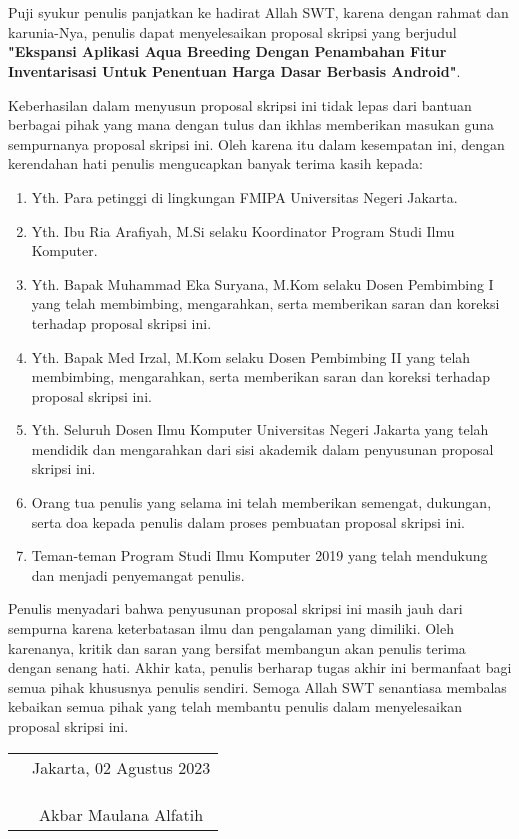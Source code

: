 \chapter*{}
 
\begin{spacing}{1.5}
	
Puji syukur penulis panjatkan ke hadirat Allah SWT, karena dengan rahmat dan karunia-Nya, penulis dapat menyelesaikan proposal skripsi yang berjudul \textbf{"Ekspansi Aplikasi Aqua Breeding Dengan Penambahan Fitur Inventarisasi Untuk Penentuan Harga Dasar Berbasis Android"}.

Keberhasilan dalam menyusun proposal skripsi ini tidak lepas dari bantuan berbagai pihak yang mana dengan tulus dan ikhlas memberikan masukan guna sempurnanya proposal skripsi ini. Oleh karena itu dalam kesempatan ini, dengan kerendahan hati penulis mengucapkan banyak terima kasih kepada:

\begin{enumerate}

	\item{Yth. Para petinggi di lingkungan FMIPA Universitas Negeri Jakarta.}
	\item{Yth. Ibu Ria Arafiyah, M.Si selaku Koordinator Program Studi Ilmu Komputer.}
	\item{Yth. Bapak Muhammad Eka Suryana, M.Kom selaku Dosen Pembimbing I yang telah membimbing, mengarahkan, serta memberikan saran dan koreksi terhadap proposal skripsi ini.}
	\item{Yth. Bapak Med Irzal, M.Kom selaku Dosen Pembimbing II yang telah membimbing, mengarahkan, serta memberikan saran dan koreksi terhadap proposal skripsi ini.}
	\item{Yth. Seluruh Dosen Ilmu Komputer Universitas Negeri Jakarta yang telah mendidik dan mengarahkan dari sisi akademik dalam penyusunan proposal skripsi ini.}
	\item{Orang tua penulis yang selama ini telah memberikan semengat, dukungan, serta doa kepada penulis dalam proses pembuatan proposal skripsi ini.}
	\item{Teman-teman Program Studi Ilmu Komputer 2019 yang telah mendukung dan menjadi penyemangat penulis.}
	
\end{enumerate}

Penulis menyadari bahwa penyusunan proposal skripsi ini masih jauh dari sempurna karena keterbatasan ilmu dan pengalaman yang dimiliki. Oleh karenanya, kritik dan saran yang bersifat membangun akan penulis terima dengan senang hati. Akhir kata, penulis berharap tugas akhir ini bermanfaat bagi semua pihak khususnya penulis sendiri. Semoga Allah SWT senantiasa membalas kebaikan semua pihak yang telah membantu penulis dalam menyelesaikan proposal skripsi ini.

\end{spacing}

\vspace{2cm}

\begin{tabular}{p{8.5cm}c}
	&Jakarta, 02 Agustus 2023\\
	&\\
	&\\
	&\\
	&Akbar Maulana Alfatih
\end{tabular}